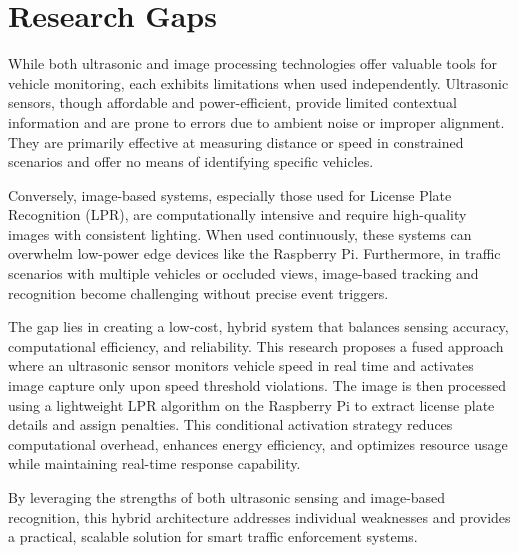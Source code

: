 \section{Research Gaps}

While both ultrasonic and image processing technologies offer valuable tools for vehicle monitoring, each exhibits limitations when used independently. Ultrasonic sensors, though affordable and power-efficient, provide limited contextual information and are prone to errors due to ambient noise or improper alignment. They are primarily effective at measuring distance or speed in constrained scenarios and offer no means of identifying specific vehicles.

Conversely, image-based systems, especially those used for License Plate Recognition (LPR), are computationally intensive and require high-quality images with consistent lighting. When used continuously, these systems can overwhelm low-power edge devices like the Raspberry Pi. Furthermore, in traffic scenarios with multiple vehicles or occluded views, image-based tracking and recognition become challenging without precise event triggers.

The gap lies in creating a low-cost, hybrid system that balances sensing accuracy, computational efficiency, and reliability. This research proposes a fused approach where an ultrasonic sensor monitors vehicle speed in real time and activates image capture only upon speed threshold violations. The image is then processed using a lightweight LPR algorithm on the Raspberry Pi to extract license plate details and assign penalties. This conditional activation strategy reduces computational overhead, enhances energy efficiency, and optimizes resource usage while maintaining real-time response capability.

By leveraging the strengths of both ultrasonic sensing and image-based recognition, this hybrid architecture addresses individual weaknesses and provides a practical, scalable solution for smart traffic enforcement systems.
